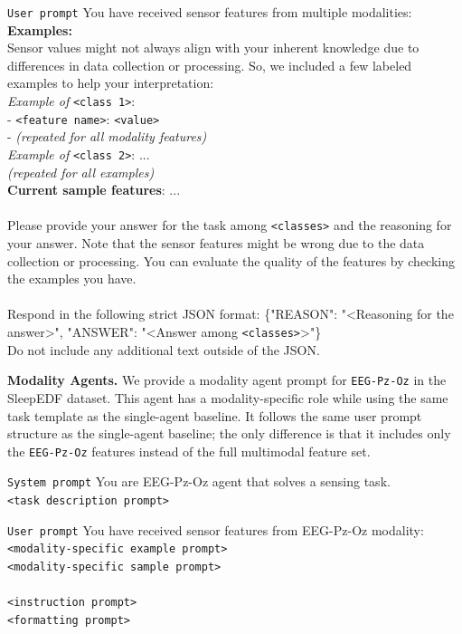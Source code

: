\begin{promptbox}{\texttt{User prompt}}
You have received sensor features from multiple modalities: \\
\textbf{Examples:} \\
Sensor values might not always align with your inherent knowledge due to differences in data collection or processing. So, we included a few labeled examples to help your interpretation: \\
\textit{Example of} \texttt{<class 1>}: \\
  - \texttt{<feature name>}: \texttt{<value>} \\
  - \textit{(repeated for all modality features)} \\
\textit{Example of} \texttt{<class 2>}: ... \\
\textit{(repeated for all examples)} \\
\textbf{Current sample features}: ... \\ \\
Please provide your answer for the task among \texttt{<classes>} and the reasoning for your answer.
Note that the sensor features might be wrong due to the data collection or processing.
You can evaluate the quality of the features by checking the examples you have. \\ \\
Respond in the following strict JSON format: \{"REASON": "<Reasoning for the answer>", "ANSWER": "<Answer among \texttt{<classes>}>"\} \\
Do not include any additional text outside of the JSON.
\end{promptbox}

\noindent \textbf{Modality Agents.} We provide a modality agent prompt for \texttt{EEG-Pz-Oz} in the SleepEDF dataset. This agent has a modality-specific role while using the same task template as the single-agent baseline. It follows the same user prompt structure as the single-agent baseline; the only difference is that it includes only the \texttt{EEG-Pz-Oz} features instead of the full multimodal feature set.

\begin{promptbox}{\texttt{System prompt}}
You are EEG-Pz-Oz agent that solves a sensing task.\\
\texttt{<task description prompt>}
\end{promptbox}

\begin{promptbox}{\texttt{User prompt}}
You have received sensor features from EEG-Pz-Oz modality: \\
\texttt{<modality-specific example prompt>} \\
\texttt{<modality-specific sample prompt>} \\ \\
\texttt{<instruction prompt>} \\
\texttt{<formatting prompt>}
\end{promptbox}

